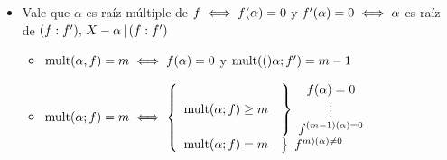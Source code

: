 \begin{itemize}
	\item Vale que $\alpha$ es raíz múltiple de $f \sisolosi f(\alpha) = 0$ y $f'(\alpha) = 0 \sisolosi \alpha$
	      es raíz de $(f:f'),\, X - \alpha \divideA (f:f')$
	      \begin{itemize}
		      \item $\mult{\alpha,f} = m \sisolosi f(\alpha) = 0$ y $\mult(\alpha;f') = m-1$

		      \item $\mult{\alpha;f} = m \sisolosi
			            \llave{rl}{
				            \mult{\alpha;f}\geq m     &
				            \llaveInv{c}{
					            f(\alpha) = 0\\
					            \vdots\\
					            f^{(m-1)(\alpha) = 0}
				            }\\
				            \mult{\alpha;f} = m     &
				            \llaveInv{c}{
					            f^{m)(\alpha) \distinto 0}
				            }
			            }$
	      \end{itemize}
\end{itemize}
